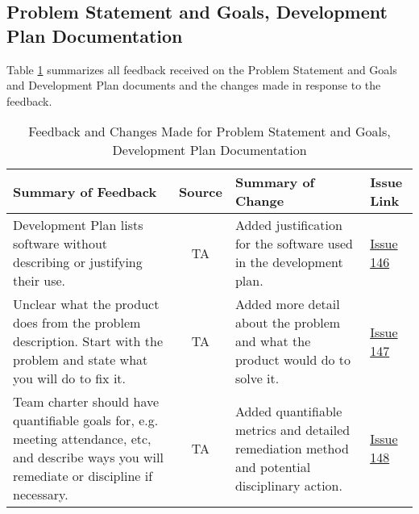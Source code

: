 \documentclass{article}
\begin{document}



\subsection{Problem Statement and Goals, Development Plan Documentation}
Table \ref{table:PSGDV} summarizes all feedback received on the Problem
Statement and Goals and Development Plan documents and the changes made in
response to the feedback.
\begin{table}[H]
\centering
\begin{tabularx}{\textwidth}{|X|c|X|p{1cm}|}
    \hline
    \textbf{Summary of Feedback} & \textbf{Source} & \textbf{Summary of Change}
    & \textbf{Issue Link} \\
    \hline
    Development Plan lists software without describing or justifying their use.
    & TA & Added justification for the software used in the development plan. &
    \href{https://github.com/SumanyaG/Alkalytics/issues/146}{Issue 146} \\
    \hline
    Unclear what the product does from the problem description. Start with the
    problem and state what you will do to fix it. & TA & Added more detail about
    the problem and what the product would do to solve it. &
    \href{https://github.com/SumanyaG/Alkalytics/issues/147}{Issue 147} \\
    \hline
    Team charter should have quantifiable goals for, e.g. meeting attendance,
    etc, and describe ways you will remediate or discipline if necessary. & TA &
    Added quantifiable metrics and detailed remediation method and potential
    disciplinary action. &
    \href{https://github.com/SumanyaG/Alkalytics/issues/148}{Issue 148} \\
    \hline
\end{tabularx}
\caption{Feedback and Changes Made for Problem Statement and Goals, Development Plan Documentation}
\label{table:PSGDV}
\end{table}
\end{document}
